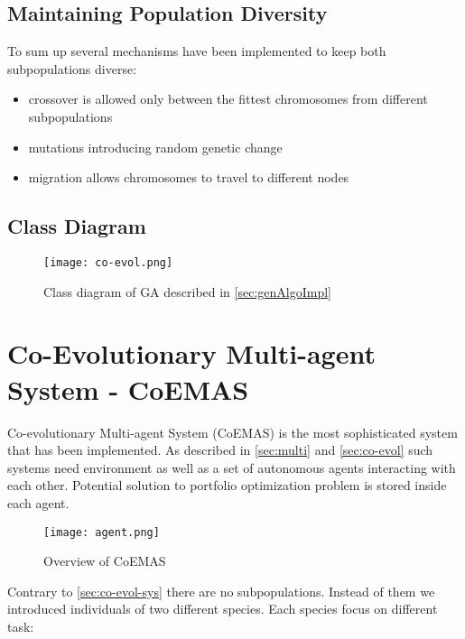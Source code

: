 \subsection{Maintaining Population Diversity}

To sum up several mechanisms have been implemented to keep both subpopulations diverse:

\begin{itemize}
  \item crossover is allowed only between the fittest chromosomes from different subpopulations 
  \item mutations introducing random genetic change
  \item migration allows chromosomes to travel to different nodes  
\end{itemize}

\subsection{Class Diagram}
\label{Co-evol-class-diagram}

\begin{figure}[H]   
	    \begin{center}
	      \texttt{[image: co-evol.png]}
	    \end{center}
	    \caption{Class diagram of GA described in \ref{sec:genAlgoImpl}} 
	  \end{figure}


\section{Co-Evolutionary Multi-agent System - CoEMAS}

Co-evolutionary Multi-agent System (CoEMAS) is the most sophisticated system that has been implemented.
As described in \ref{sec:multi} and \ref{sec:co-evol} such systems need environment as well as a set of autonomous agents interacting with each other.
Potential solution to portfolio optimization problem is stored inside each agent.


\begin{figure}[H]   
	    \begin{center}
	      \texttt{[image: agent.png]}
	    \end{center}
	    \caption{Overview of CoEMAS} 
	  \end{figure}

Contrary to \ref{sec:co-evol-sys} there are no subpopulations.
Instead of them we introduced individuals of two different species.
Each species focus on different task:

